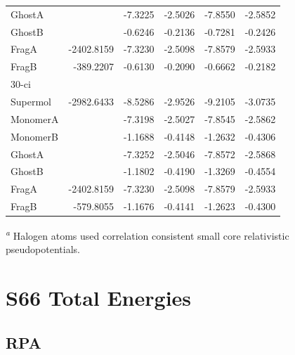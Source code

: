 \documentclass[journal=jctcce,manuscript=article]{achemso}
\begin{document}
\begin{spacing}{1}
\begin{longtable}{lRRRRR}
    GhostA &       & -7.3225 & -2.5026 & -7.8550 & -2.5852 \\
    GhostB &       & -0.6246 & -0.2136 & -0.7281 & -0.2426 \\
    FragA & -2402.8159 & -7.3230 & -2.5098 & -7.8579 & -2.5933 \\
    FragB & -389.2207 & -0.6130 & -0.2090 & -0.6662 & -0.2182 \\
    30-ci &       &       &       &       &  \\
    Supermol & -2982.6433 & -8.5286 & -2.9526 & -9.2105 & -3.0735 \\
    MonomerA &       & -7.3198 & -2.5027 & -7.8545 & -2.5862 \\
    MonomerB &       & -1.1688 & -0.4148 & -1.2632 & -0.4306 \\
    GhostA &       & -7.3252 & -2.5046 & -7.8572 & -2.5868 \\
    GhostB &       & -1.1802 & -0.4190 & -1.3269 & -0.4554 \\
    FragA & -2402.8159 & -7.3230 & -2.5098 & -7.8579 & -2.5933 \\
    FragB & -579.8055 & -1.1676 & -0.4141 & -1.2623 & -0.4300 \\
  \hline 
\end{longtable}
\vspace{-0.3cm}
\textsuperscript{\emph{a}} Halogen atoms used correlation consistent
small core relativistic pseudopotentials.\cite{doi:10.1063/1.1622924,doi:10.1021/jp065887l}
\section{S66 Total Energies}

\subsection{RPA}


\end{spacing}
\end{document}
